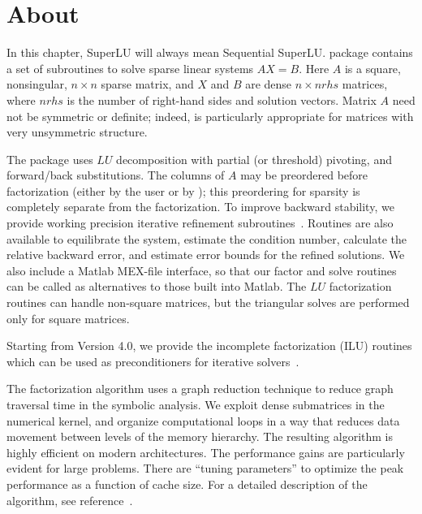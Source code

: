 
\section{About {\superlu}}

In this chapter, SuperLU will always mean Sequential SuperLU.
{\superlu} package contains a set of subroutines to solve sparse 
linear systems $AX=B$. Here $A$ is a square, nonsingular, $n\times n$
sparse matrix, and  
$X$ and $B$ are dense $n\times nrhs$ matrices, where 
$nrhs$ is the number of right-hand sides and solution vectors.
Matrix $A$ need not be symmetric or definite; indeed, {\superlu} is
particularly appropriate for matrices with very unsymmetric structure.

The package uses $LU$ decomposition with partial (or threshold) pivoting,
and forward/back substitutions. The columns of $A$ may be preordered before 
factorization (either by the user or by \superlu); 
this preordering for sparsity is completely separate from 
the factorization. To improve backward stability, we provide working 
precision iterative refinement subroutines~\cite{arioli89}. 
Routines are also available to 
equilibrate the system, estimate the condition number, calculate 
the relative backward error, and estimate error bounds for the 
refined solutions. We also include a Matlab MEX-file interface, so that
our factor and solve routines can be called as alternatives to those 
built into Matlab. The $LU$ factorization routines can handle
non-square matrices, but the triangular solves are performed only
for square matrices.

    Starting from Version 4.0, we provide the incomplete factorization
(ILU) routines which can be used as preconditioners for iterative
solvers~\cite{lishao10}.

    The factorization algorithm uses a graph reduction technique to 
reduce graph traversal time in the symbolic analysis. We exploit
dense submatrices in the numerical kernel, and organize computational
loops in a way that reduces data movement between levels of the
memory hierarchy.
The resulting algorithm is highly efficient on modern architectures.
The performance gains are particularly evident for large problems.
There are ``tuning parameters'' to optimize the peak performance as
a function of cache size. For a detailed description of the algorithm,
see reference~\cite{superlu99}.

